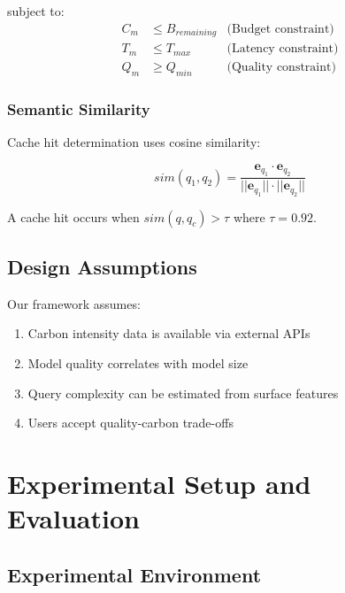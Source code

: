 \documentclass[conference]{IEEEtran}
\begin{document}
subject to:
\begin{align}
C_m &\leq B_{remaining} & \text{(Budget constraint)} \\
T_m &\leq T_{max} & \text{(Latency constraint)} \\
Q_m &\geq Q_{min} & \text{(Quality constraint)}
\end{align}

\subsubsection{Semantic Similarity}

Cache hit determination uses cosine similarity:

\begin{equation}
sim(q_1, q_2) = \frac{\mathbf{e}_{q_1} \cdot \mathbf{e}_{q_2}}{||\mathbf{e}_{q_1}|| \cdot ||\mathbf{e}_{q_2}||}
\label{eq:similarity}
\end{equation}

A cache hit occurs when $sim(q, q_c) > \tau$ where $\tau = 0.92$.

\subsection{Design Assumptions}

Our framework assumes:

\begin{enumerate}
    \item Carbon intensity data is available via external APIs
    \item Model quality correlates with model size
    \item Query complexity can be estimated from surface features
    \item Users accept quality-carbon trade-offs
\end{enumerate}

\section{Experimental Setup and Evaluation}

\subsection{Experimental Environment}
\end{document}
